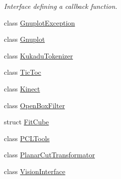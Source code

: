 \begin{DoxyCompactItemize}
\begin{DoxyCompactList}\small\item\em Interface defining a callback function. \end{DoxyCompactList}\item 
class \hyperlink{classkukadu_1_1GnuplotException}{Gnuplot\-Exception}
\item 
class \hyperlink{classkukadu_1_1Gnuplot}{Gnuplot}
\item 
class \hyperlink{classkukadu_1_1KukaduTokenizer}{Kukadu\-Tokenizer}
\item 
class \hyperlink{classkukadu_1_1TicToc}{Tic\-Toc}
\item 
class \hyperlink{classkukadu_1_1Kinect}{Kinect}
\item 
class \hyperlink{classkukadu_1_1OpenBoxFilter}{Open\-Box\-Filter}
\item 
struct \hyperlink{structkukadu_1_1FitCube}{Fit\-Cube}
\item 
class \hyperlink{classkukadu_1_1PCLTools}{P\-C\-L\-Tools}
\item 
class \hyperlink{classkukadu_1_1PlanarCutTransformator}{Planar\-Cut\-Transformator}
\item 
class \hyperlink{classkukadu_1_1VisionInterface}{Vision\-Interface}
\end{DoxyCompactItemize}

